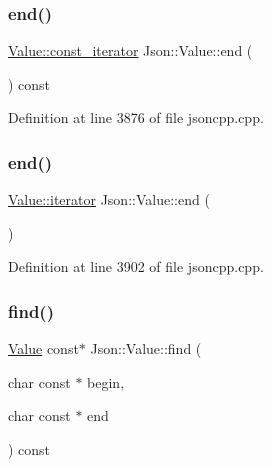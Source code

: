 \hypertarget{class_json_1_1_value_a3e443cd0ef24f7e028b175e47ee045e0}{}\label{class_json_1_1_value_a3e443cd0ef24f7e028b175e47ee045e0} 
\subsubsection{\texorpdfstring{end()}{end()}\hspace{0.1cm}{\footnotesize\ttfamily [3/4]}}
{\footnotesize\ttfamily \hyperlink{class_json_1_1_value_af92282ca92b58b320debd486afb7696a}{Value\+::const\+\_\+iterator} Json\+::\+Value\+::end (\begin{DoxyParamCaption}{ }\end{DoxyParamCaption}) const}



Definition at line 3876 of file jsoncpp.\+cpp.

\hypertarget{class_json_1_1_value_a2f961eff73f7f79cd29260b6cbd42558}{}\label{class_json_1_1_value_a2f961eff73f7f79cd29260b6cbd42558} 
\subsubsection{\texorpdfstring{end()}{end()}\hspace{0.1cm}{\footnotesize\ttfamily [4/4]}}
{\footnotesize\ttfamily \hyperlink{class_json_1_1_value_a341cdf2e01f8b3c5b7317aa2f0768c53}{Value\+::iterator} Json\+::\+Value\+::end (\begin{DoxyParamCaption}{ }\end{DoxyParamCaption})}



Definition at line 3902 of file jsoncpp.\+cpp.

\hypertarget{class_json_1_1_value_a111101d212bf787bbe515388d726a175}{}\label{class_json_1_1_value_a111101d212bf787bbe515388d726a175} 
\subsubsection{\texorpdfstring{find()}{find()}\hspace{0.1cm}{\footnotesize\ttfamily [1/2]}}
{\footnotesize\ttfamily \hyperlink{class_json_1_1_value}{Value} const$\ast$ Json\+::\+Value\+::find (\begin{DoxyParamCaption}\item[{char const $\ast$}]{begin,  }\item[{char const $\ast$}]{end }\end{DoxyParamCaption}) const}

